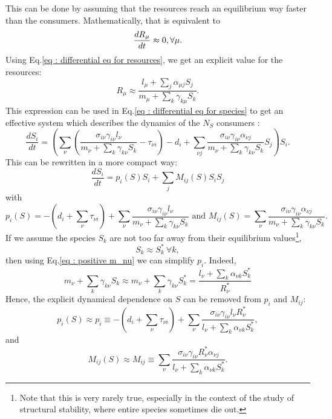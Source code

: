 \documentclass[12pt]{report}
\begin{document}
This can be done by assuming that the resources reach an equilibrium way faster than the consumers.
Mathematically, that is equivalent to
\begin{equation}
  \frac{dR_\mu}{dt} \approx 0, \\ \forall \mu.
\end{equation}
Using Eq.\eqref{eq : differential eq for resources}, we get an explicit value for the resources:
\begin{equation}
  R_\mu \approx \frac{l_\mu+\sum_j \alpha_{\mu j}S_j}{m_\mu + \sum_k \gamma_{k\mu}S_k}.
\end{equation}
This expression can be used in Eq.\eqref{eq : differential eq for species} to get an effective system which describes the dynamics of the $N_S$ consumers :
\begin{equation}
  \frac{dS_i}{dt} = \left(\sum_\nu \left(\frac{\sigma_{i\nu}\gamma_{i\nu}l_\nu}{m_\nu+\sum_k \gamma_{k\nu}S_k} - \tau_{\nu i}\right) -d_i + \sum_{\nu j} \frac{\sigma_{i\nu}\gamma_{i\nu}\alpha_{\nu j}}{m_\nu+\sum_{k}\gamma_{k\nu}S_k}S_j \right) S_i.
\end{equation}
This can be rewritten in a more compact way:
\begin{equation}
  \frac{dS_i}{dt} = p_i(S) S_i + \sum_j M_{ij}(S)S_i S_j \label{eq : effective equations of evolution}
\end{equation}
with
\begin{equation}
    p_i(S) = -\left(d_i+\sum_{\nu}\tau_{\nu i}\right) + \sum_\nu \frac{\sigma_{i\nu}\gamma_{i\nu}l_\nu}{m_\nu+\sum_k \gamma_{k\nu}S_k}\text{ and } M_{ij}(S)=\sum_{\nu}\frac{\sigma_{i\nu}\gamma_{i\nu}\alpha_{\nu j}}{m_\nu+\sum_{k}\gamma_{k\nu}S_k}.
\end{equation}
If we assume the species $S_k$ are not too far away from their equilibrium values\footnote{Note that this is very rarely true, especially in the context of the study of structural stability, where entire species sometimes die out.}, \ie
\begin{equation}
S_k \approx S^*_k \ \forall k,
\end{equation}
then using Eq.\eqref{eq : positive m_nu} we can simplify $p_i$. Indeed,
\begin{equation}
m_\nu + \sum_k \gamma_{k\nu} S_k \approx m_\nu + \sum_k \gamma_{k\nu}S^*_k = \frac{l_\nu + \sum_k \alpha_{\nu k}S^*_k}{R^*_\nu} \label{eq : equality fluxes resource}
\end{equation}
Hence, the explicit dynamical dependence on $S$ can be removed from $p_i$ and $M_{ij}$:
\begin{equation}
p_i(S) \approx p_i \equiv - \left(d_i + \sum_\nu \tau_{\nu i}\right) + \sum_\nu \frac{\sigma_{i\nu}\gamma_{i\nu}l_\nu R^*_\nu}{l_\nu + \sum_k \alpha_{\nu k}S^*_k},
\end{equation} and
\begin{equation}
M_{ij}(S) \approx M_{ij} \equiv \sum_\nu \frac{\sigma_{i\nu} \gamma_{i\nu} R^*_\nu \alpha_{\nu j}}{l_\nu + \sum_k{\alpha_{\nu k} S^*_k}}.
\end{equation}
\end{document}
